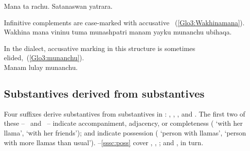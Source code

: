 %
{Mana ta rachu. Satanaswan yatrara.}%
{}%
{}{}%

\noindent
Infinitive complements are case-marked with accusative ~(\ref{Glo3:Wakhinamana}).\\

%
{Wakhina mana vininu tuma munashpatri manam yayku munanchu ubihaqa.}%
{}%
{}{}%

\noindent
In the \CH{} dialect, accusative marking in this structure is sometimes elided,~(\ref{Glo3:munanchu}).\\

%
{Manam lulay munanchu.}%
{}%
{}{}%

\subsection{Substantives derived from substantives}\label{ssec:sdfs}
Four suffixes derive substantives from substantives in \SYQ{}: , , , and . The first two of these --~ and ~-- indicate accompaniment, adjacency, or completeness ( ‘with her llama’,  ‘with her friends’);  and  indicate possession ( ‘person with llamas’,  ‘person with more llamas than usual’). --\ref{sssc:poss} cover , , ; and , in turn.

